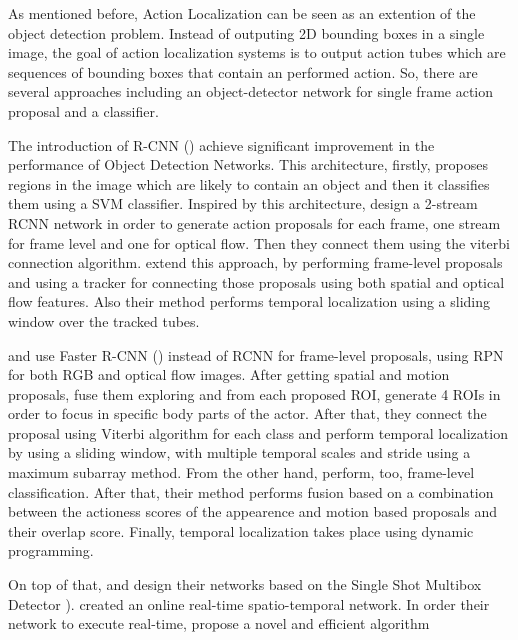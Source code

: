\documentclass{report}
\begin{document}
As mentioned before, Action Localization can be seen as an extention of the object detection problem. Instead of outputing 2D bounding
boxes in a single image, the goal of action localization systems is to output action tubes which are sequences of bounding boxes that
contain an performed action. So, there are several approaches including an object-detector network for single frame
action proposal and a classifier. \par
The introduction of R-CNN (\cite{DBLP:journals/corr/GirshickDDM13}) achieve significant improvement
in the performance of Object Detection Networks. This architecture, firstly, proposes regions in the image which are likely to
contain an object and then it classifies them using a SVM classifier. Inspired by this architecture, \cite{DBLP:journals/corr/GkioxariM14}
design a 2-stream RCNN network in order to generate action proposals for each frame, one stream for frame level and one for optical flow.
Then they  connect them using the viterbi connection algorithm. \cite{DBLP:journals/corr/WeinzaepfelHS15} extend this approach, by performing
frame-level proposals and using a tracker for connecting those proposals using both spatial and optical flow features. Also their method performs
temporal localization using a sliding window over the tracked tubes. \par
\cite{peng:hal-01349107} and \cite{DBLP:journals/corr/SahaSSTC16} use Faster R-CNN (\cite{Ren:2015:FRT:2969239.2969250}) instead of RCNN
for frame-level proposals, using RPN for both RGB and optical flow images.
After getting spatial and motion proposals,\cite{peng:hal-01349107} fuse them exploring and from each proposed ROI, generate 4 ROIs in order to focus in specific
body parts of the actor. After that, they connect the proposal using Viterbi algorithm for each class and perform temporal localization by using a sliding window, with multiple
temporal scales and stride using a maximum subarray method. From the other hand, \cite{DBLP:journals/corr/SahaSSTC16} perform, too, frame-level classification. After that,
their method performs fusion based on a combination between the actioness scores of the appearence and motion based proposals and their overlap score. Finally, temporal localization
takes place using dynamic programming. \par
On top of that, \cite{singh2016online} and \cite{kalogeiton17iccv:hal-01519812} design their networks based on the Single Shot Multibox Detector \cite{DBLP:journals/corr/LiuAESR15}).
\cite{singh2016online} created an online real-time spatio-temporal network. In order their network to execute real-time,  \cite{singh2016online} propose a novel and efficient algorithm
\end{document}
